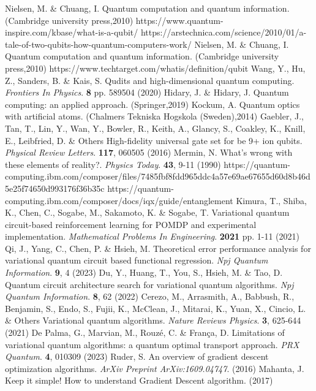 \documentclass[inscr,ack,preface]{diphdthesis}
\begin{document}
\begin{thebibliography}{99}                                                                     
Nielsen, M. \& Chuang, I. Quantum computation and quantum information. (Cambridge university press,2010)
https://www.quantum-inspire.com/kbase/what-is-a-qubit/
https://arstechnica.com/science/2010/01/a-tale-of-two-qubits-how-quantum-computers-work/
Nielsen, M. \& Chuang, I. Quantum computation and quantum information. (Cambridge university press,2010)
https://www.techtarget.com/whatis/definition/qubit
Wang, Y., Hu, Z., Sanders, B. \& Kais, S. Qudits and high-dimensional quantum computing. {\em Frontiers In Physics}. \textbf{8} pp. 589504 (2020)
Hidary, J. \& Hidary, J. Quantum computing: an applied approach. (Springer,2019)
Kockum, A. Quantum optics with artificial atoms. (Chalmers Tekniska Hogskola (Sweden),2014)
Gaebler, J., Tan, T., Lin, Y., Wan, Y., Bowler, R., Keith, A., Glancy, S., Coakley, K., Knill, E., Leibfried, D. \& Others High-fidelity universal gate set for be 9+ ion qubits. {\em Physical Review Letters}. \textbf{117}, 060505 (2016)
Mermin, N. What's wrong with these elements of reality?. {\em Physics Today}. \textbf{43}, 9-11 (1990)
https://quantum-computing.ibm.com/composer/files/7485fbf8fdd965ddc4a57e69ae67655d60d8b46d5e25f74650d993176f36b35c
https://quantum-computing.ibm.com/composer/docs/iqx/guide/entanglement
Kimura, T., Shiba, K., Chen, C., Sogabe, M., Sakamoto, K. \& Sogabe, T. Variational quantum circuit-based reinforcement learning for POMDP and experimental implementation. {\em Mathematical Problems In Engineering}. \textbf{2021} pp. 1-11 (2021)
Qi, J., Yang, C., Chen, P. \& Hsieh, M. Theoretical error performance analysis for variational quantum circuit based functional regression. {\em Npj Quantum Information}. \textbf{9}, 4 (2023)
Du, Y., Huang, T., You, S., Hsieh, M. \& Tao, D. Quantum circuit architecture search for variational quantum algorithms. {\em Npj Quantum Information}. \textbf{8}, 62 (2022)
Cerezo, M., Arrasmith, A., Babbush, R., Benjamin, S., Endo, S., Fujii, K., McClean, J., Mitarai, K., Yuan, X., Cincio, L. \& Others Variational quantum algorithms. {\em Nature Reviews Physics}. \textbf{3}, 625-644 (2021)
De Palma, G., Marvian, M., Rouzé, C. \& França, D. Limitations of variational quantum algorithms: a quantum optimal transport approach. {\em PRX Quantum}. \textbf{4}, 010309 (2023)
Ruder, S. An overview of gradient descent optimization algorithms. {\em ArXiv Preprint ArXiv:1609.04747}. (2016)
Mahanta, J. Keep it simple! How to understand Gradient Descent algorithm.  (2017)








\end{thebibliography}
\end{document}
